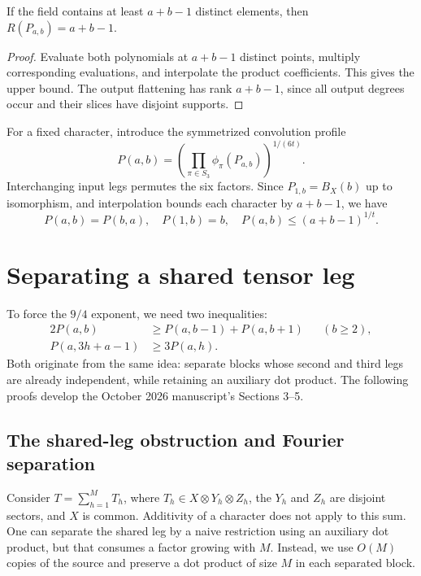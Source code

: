 \begin{lemma}
\label{lem:mm-nine-fourths-vandermonde}
If the field contains at least \(a+b-1\) distinct elements, then \(R(P_{a,b})=a+b-1\).
\end{lemma}
\begin{proof}
Evaluate both polynomials at \(a+b-1\) distinct points, multiply corresponding evaluations, and interpolate the product coefficients. This gives the upper bound. The output flattening has rank \(a+b-1\), since all output degrees occur and their slices have disjoint supports.
\end{proof}

For a fixed character, introduce the symmetrized convolution profile
\begin{equation}
 P(a,b)=\left(\prod_{\pi\in S_3}\phi_\pi(P_{a,b})\right)^{1/(6t)}.
 \label{eq:mm-nine-fourths-Pab-norm}
\end{equation}
Interchanging input legs permutes the six factors. Since \(P_{1,b}=B_X(b)\) up to isomorphism, and interpolation bounds each character by \(a+b-1\), we have
\begin{equation}
 P(a,b)=P(b,a),\quad P(1,b)=b,\quad
 P(a,b)\leq(a+b-1)^{1/t}.
 \label{eq:mm-nine-fourths-upper-anchor}
\end{equation}

\section{Separating a shared tensor leg}

To force the \(9/4\) exponent, we need two inequalities:
\begin{align}
 2P(a,b)&\geq P(a,b-1)+P(a,b+1) &&(b\geq2),\label{eq:mm-nine-fourths-concavity}\\
 P(a,3h+a-1)&\geq3P(a,h).\label{eq:mm-nine-fourths-recurrence}
\end{align}
Both originate from the same idea: separate blocks whose second and third legs are already independent, while retaining an auxiliary dot product. The following proofs develop the October 2026 manuscript's Sections 3--5.

\subsection{The shared-leg obstruction and Fourier separation}

Consider \(T=\sum_{h=1}^M T_h\), where \(T_h\in X\otimes Y_h\otimes Z_h\), the \(Y_h\) and \(Z_h\) are disjoint sectors, and \(X\) is common. Additivity of a character does not apply to this sum. One can separate the shared leg by a naive restriction using an auxiliary dot product, but that consumes a factor growing with \(M\). Instead, we use \(O(M)\) copies of the source and preserve a dot product of size \(M\) in each separated block.

